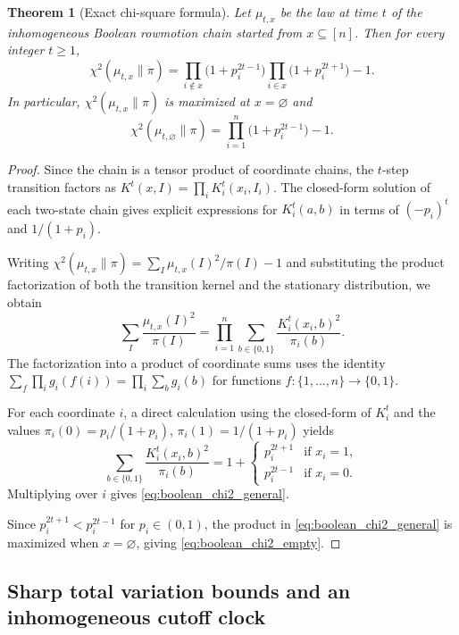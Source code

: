 \documentclass[final,3p,times]{elsarticle}
\newtheorem{theorem}{Theorem}[section]
\theoremstyle{definition}
\begin{document}
\begin{theorem}[Exact chi-square formula]\label{thm:boolean_chi2_general}
Let $\mu_{t,x}$ be the law at time $t$ of the inhomogeneous Boolean rowmotion chain started from $x\subseteq[n]$.
Then for every integer $t\ge 1$,
\begin{equation}\label{eq:boolean_chi2_general}
\chi^2(\mu_{t,x}\|\pi)
=
\prod_{i\notin x}\bigl(1+p_i^{2t-1}\bigr)
\prod_{i\in x}\bigl(1+p_i^{2t+1}\bigr)
-1.
\end{equation}
In particular, $\chi^2(\mu_{t,x}\|\pi)$ is maximized at $x=\varnothing$ and
\begin{equation}\label{eq:boolean_chi2_empty}
\chi^2(\mu_{t,\varnothing}\|\pi)=\prod_{i=1}^n\bigl(1+p_i^{2t-1}\bigr)-1.
\end{equation}
\end{theorem}

\begin{proof}
Since the chain is a tensor product of coordinate chains, the $t$-step transition factors as $K^t(x,I) = \prod_i K_i^t(x_i, I_i)$.
The closed-form solution of each two-state chain gives explicit expressions for $K_i^t(a,b)$ in terms of $(-p_i)^t$ and $1/(1+p_i)$.

Writing $\chi^2(\mu_{t,x}\|\pi) = \sum_I \mu_{t,x}(I)^2/\pi(I) - 1$ and substituting the product factorization of both the transition kernel and the stationary distribution, we obtain
\[
\sum_I \frac{\mu_{t,x}(I)^2}{\pi(I)} = \prod_{i=1}^n \sum_{b\in\{0,1\}} \frac{K_i^t(x_i,b)^2}{\pi_i(b)}.
\]
The factorization into a product of coordinate sums uses the identity $\sum_f \prod_i g_i(f(i)) = \prod_i \sum_b g_i(b)$ for functions $f:\{1,\dots,n\}\to\{0,1\}$.

For each coordinate $i$, a direct calculation using the closed-form of $K_i^t$ and the values $\pi_i(0) = p_i/(1+p_i)$, $\pi_i(1)=1/(1+p_i)$ yields
\[
\sum_{b\in\{0,1\}} \frac{K_i^t(x_i,b)^2}{\pi_i(b)} = 1 + \begin{cases} p_i^{2t+1} & \text{if } x_i = 1,\\ p_i^{2t-1} & \text{if } x_i = 0.\end{cases}
\]
Multiplying over $i$ gives \eqref{eq:boolean_chi2_general}.

Since $p_i^{2t+1}<p_i^{2t-1}$ for $p_i\in(0,1)$, the product in \eqref{eq:boolean_chi2_general} is maximized when $x=\varnothing$, giving \eqref{eq:boolean_chi2_empty}.
\end{proof}

\subsection{Sharp total variation bounds and an inhomogeneous cutoff clock}
\end{document}
